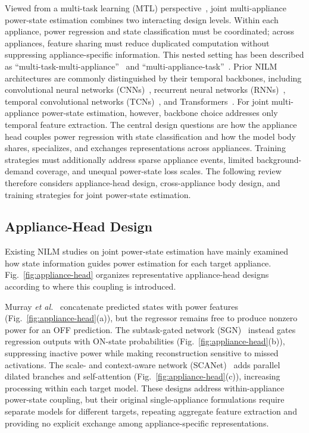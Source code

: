 \documentclass[journal]{IEEEtran}
\begin{document}
Viewed from a multi-task learning (MTL) perspective~\cite{vandenhende2022survey}, joint multi-appliance power-state estimation combines two interacting design levels. Within each appliance, power regression and state classification must be coordinated; across appliances, feature sharing must reduce duplicated computation without suppressing appliance-specific information. This nested setting has been described as ``multi-task-multi-appliance''~\cite{faustine2020unet} and ``multi-appliance-task''~\cite{xiong2024matnilm,sun2025transfer}. Prior NILM architectures are commonly distinguished by their temporal backbones, including convolutional neural networks (CNNs)~\cite{faustine2020unet,xiong2024matnilm}, recurrent neural networks (RNNs)~\cite{murray2019transferability}, temporal convolutional networks (TCNs)~\cite{alami2023convnilm,dash2024jestie}, and Transformers~\cite{sun2025transfer}. For joint multi-appliance power-state estimation, however, backbone choice addresses only temporal feature extraction. The central design questions are how the appliance head couples power regression with state classification and how the model body shares, specializes, and exchanges representations across appliances. Training strategies must additionally address sparse appliance events, limited background-demand coverage, and unequal power-state loss scales. The following review therefore considers appliance-head design, cross-appliance body design, and training strategies for joint power-state estimation.

\subsection{Appliance-Head Design}
\label{sec:related-head}

Existing NILM studies on joint power-state estimation have mainly examined how state information guides power estimation for each target appliance. Fig.~\ref{fig:appliance-head} organizes representative appliance-head designs according to where this coupling is introduced.

Murray \emph{et al.}~\cite{murray2019transferability} concatenate predicted states with power features (Fig.~\ref{fig:appliance-head}(a)), but the regressor remains free to produce nonzero power for an OFF prediction. The subtask-gated network (SGN)~\cite{shin2019sgn} instead gates regression outputs with ON-state probabilities (Fig.~\ref{fig:appliance-head}(b)), suppressing inactive power while making reconstruction sensitive to missed activations. The scale- and context-aware network (SCANet)~\cite{chen2020sca} adds parallel dilated branches and self-attention (Fig.~\ref{fig:appliance-head}(c)), increasing processing within each target model. These designs address within-appliance power-state coupling, but their original single-appliance formulations require separate models for different targets, repeating aggregate feature extraction and providing no explicit exchange among appliance-specific representations.
\end{document}
